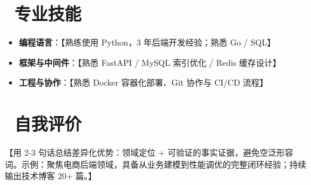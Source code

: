 \documentclass[10.5pt]{article}
\begin{document}
\section{\faCogs\ 专业技能}
\begin{itemize}
  \item \textbf{编程语言}：【熟练使用 Python，3 年后端开发经验；熟悉 Go / SQL】
  \item \textbf{框架与中间件}：【熟悉 FastAPI / MySQL 索引优化 / Redis 缓存设计】
  \item \textbf{工程与协作}：【熟悉 Docker 容器化部署、Git 协作与 CI/CD 流程】
\end{itemize}

\section{\faUser\ 自我评价}
【用 2-3 句话总结差异化优势：领域定位 + 可验证的事实证据，避免空泛形容词。示例：聚焦电商后端领域，具备从业务建模到性能调优的完整闭环经验；持续输出技术博客 20+ 篇。】
\end{document}

